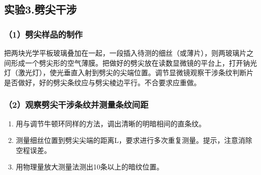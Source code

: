 \documentclass[11pt,a4paper,oneside]{article}
\begin{document}
\subsection*{实验3.劈尖干涉}
\subsubsection*{（1）劈尖样品的制作}
把两块光学平板玻璃叠加在一起，一段插入待测的细丝（或薄片），则两玻璃片之间形成一个劈尖形的空气薄膜。把做好的劈尖放在读数显微镜的平台上，打开钠光灯（激光灯），使光垂直入射到劈尖的尖端位置。调节显微镜观察干涉条纹判断片是否做好，好的劈尖条纹应与劈尖棱边平行。不合要求应重做。
\subsubsection*{（2）观察劈尖干涉条纹并测量条纹间距}
\begin{enumerate}
	\item 用与调节牛顿环同样的方法，调出清晰的明暗相间的直条纹。
	\item 测量细丝位置到劈尖尖端的距离L，要求进行多次重复测量。提示，注意消除空程误差。
	\item 用物理量放大测量法测出10条以上的暗纹位置。
\end{enumerate}
\end{document}
